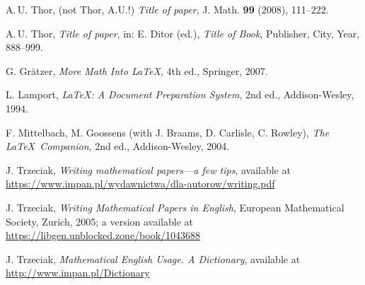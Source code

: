 \documentclass[a4paper,draft]{amsproc}
\theoremstyle{plain}
\theoremstyle{definition}
\theoremstyle{remark}
\numberwithin{equation}{section}
\begin{document}

\begin{thebibliography}{n} %

 A.\,U. Thor, (not Thor, A.U.!)
\emph{Title of paper},
J. Math. \textbf{99} (2008), 111--222.

 A.\,U. Thor,
\emph{Title of paper},
in: E. Ditor (ed.), \emph{Title of Book}, Publisher, City, Year, 888--999.

 G. Gr\"atzer,
\emph{More Math Into \LaTeX}, 4th ed.,
Springer, 2007.

 L. Lamport,
\emph{\LaTeX: A Document Preparation System}, 2nd ed.,
Addison-Wesley, 1994.

 F. Mittelbach,  M. Goossens (with J. Braams, D. Carlisle, C. Rowley),
\emph{The \LaTeX\ Companion}, 2nd ed.,
Addison-Wesley, 2004.

 J. Trzeciak, \emph{Writing mathematical papers---a few tips}, available at\\
\url{https://www.impan.pl/wydawnictwa/dla-autorow/writing.pdf}

 J. Trzeciak, \emph{Writing Mathematical Papers in English},
European Mathematical Society, Zurich, 2005; a version available at
\url{https://libgen.unblocked.zone/book/1043688}

 J. Trzeciak, \emph{Mathematical English Usage. A Dictionary}, available at\\
\url{http://www.impan.pl/Dictionary}

\end{thebibliography}
\end{document}
